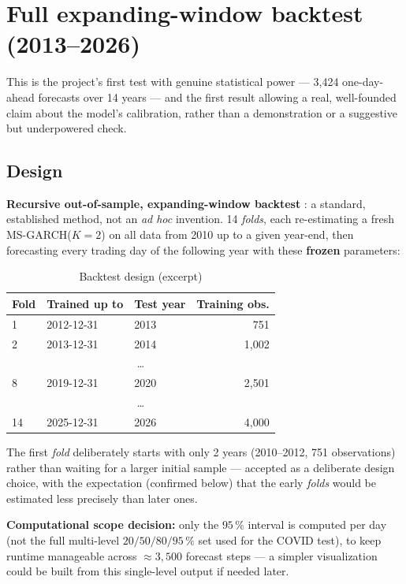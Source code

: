 \documentclass[12pt,a4paper]{article}
\begin{document}
	\section{Full expanding-window backtest (2013--2026)}
	\label{sec:backtest}
	
	This is the project's first test with genuine statistical
	power --- 3,424 one-day-ahead forecasts over 14 years --- and the first
	result allowing a real, well-founded claim about the
	model's calibration, rather than a demonstration or a
	suggestive but underpowered check.
	
	\subsection{Design}
	
	\textbf{Recursive out-of-sample, expanding-window backtest}
	\citep{west1996}: a standard, established method, not an
	\emph{ad hoc} invention. 14 \emph{folds}, each re-estimating a fresh
	MS-GARCH($K=2$) on all data from 2010 up to a given
	year-end, then forecasting every trading day of the following
	year with these \textbf{frozen} parameters:
	
	\begin{table}[H]
		\centering
		\small
		\caption{Backtest design (excerpt)}
		\begin{tabular}{lllr}
			\toprule
			Fold & Trained up to & Test year & Training obs. \\
			\midrule
			1 & 2012-12-31 & 2013 & 751 \\
			2 & 2013-12-31 & 2014 & 1,002 \\
			\multicolumn{4}{c}{\dots} \\
			8 & 2019-12-31 & 2020 & 2,501 \\
			\multicolumn{4}{c}{\dots} \\
			14 & 2025-12-31 & 2026 & 4,000 \\
			\bottomrule
		\end{tabular}
	\end{table}
	
	The first \emph{fold} deliberately starts with only 2 years
	(2010--2012, 751 observations) rather than waiting for a larger
	initial sample --- accepted as a deliberate design choice,
	with the expectation (confirmed below) that the early
	\emph{folds} would be estimated less precisely than later ones.
	
	\textbf{Computational scope decision:} only the $95\,\%$
	interval is computed per day (not the full multi-level
	$20/50/80/95\,\%$ set used for the COVID test), to keep
	runtime manageable across $\approx 3,500$ forecast steps --- a
	simpler visualization could be built from this
	single-level output if needed later.
	
\end{document}
